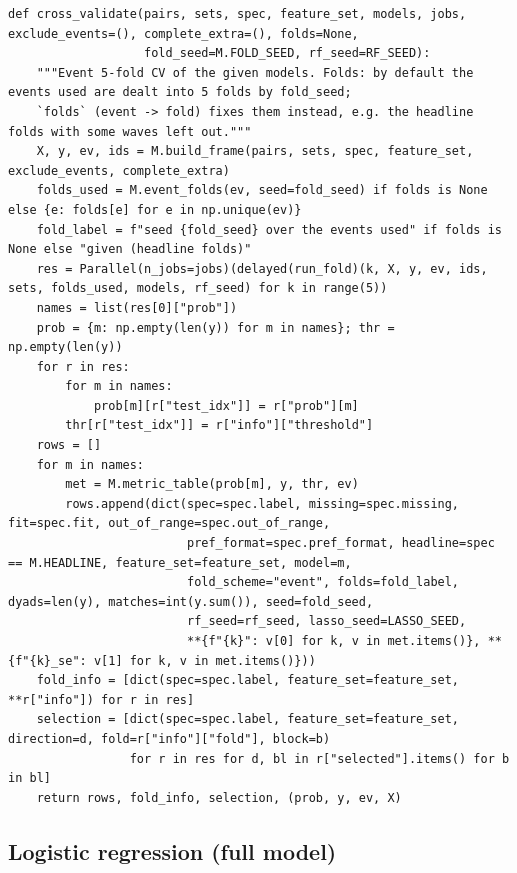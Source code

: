 \documentclass[11pt]{article}
\begin{document}
\begin{lstlisting}[caption={Event cross-validation (scripts/part1\_models.py)}]
def cross_validate(pairs, sets, spec, feature_set, models, jobs, exclude_events=(), complete_extra=(), folds=None,
                   fold_seed=M.FOLD_SEED, rf_seed=RF_SEED):
    """Event 5-fold CV of the given models. Folds: by default the events used are dealt into 5 folds by fold_seed;
    `folds` (event -> fold) fixes them instead, e.g. the headline folds with some waves left out."""
    X, y, ev, ids = M.build_frame(pairs, sets, spec, feature_set, exclude_events, complete_extra)
    folds_used = M.event_folds(ev, seed=fold_seed) if folds is None else {e: folds[e] for e in np.unique(ev)}
    fold_label = f"seed {fold_seed} over the events used" if folds is None else "given (headline folds)"
    res = Parallel(n_jobs=jobs)(delayed(run_fold)(k, X, y, ev, ids, sets, folds_used, models, rf_seed) for k in range(5))
    names = list(res[0]["prob"])
    prob = {m: np.empty(len(y)) for m in names}; thr = np.empty(len(y))
    for r in res:
        for m in names:
            prob[m][r["test_idx"]] = r["prob"][m]
        thr[r["test_idx"]] = r["info"]["threshold"]
    rows = []
    for m in names:
        met = M.metric_table(prob[m], y, thr, ev)
        rows.append(dict(spec=spec.label, missing=spec.missing, fit=spec.fit, out_of_range=spec.out_of_range,
                         pref_format=spec.pref_format, headline=spec == M.HEADLINE, feature_set=feature_set, model=m,
                         fold_scheme="event", folds=fold_label, dyads=len(y), matches=int(y.sum()), seed=fold_seed,
                         rf_seed=rf_seed, lasso_seed=LASSO_SEED,
                         **{f"{k}": v[0] for k, v in met.items()}, **{f"{k}_se": v[1] for k, v in met.items()}))
    fold_info = [dict(spec=spec.label, feature_set=feature_set, **r["info"]) for r in res]
    selection = [dict(spec=spec.label, feature_set=feature_set, direction=d, fold=r["info"]["fold"], block=b)
                 for r in res for d, bl in r["selected"].items() for b in bl]
    return rows, fold_info, selection, (prob, y, ev, X)
\end{lstlisting}

\subsection{Logistic regression (full model)}
\end{document}
